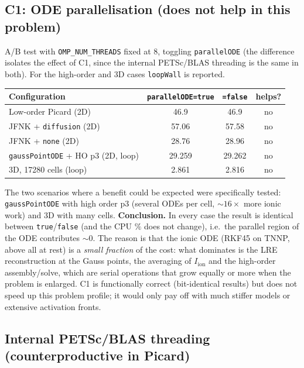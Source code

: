 \documentclass[11pt,a4paper]{article}
\newcommand{\code}[1]{\texttt{\small #1}}
\newcommand{\Iion}{I_{\mathrm{ion}}}
\newcommand{\dictkey}[1]{\textcolor{black!60!green}{\texttt{\footnotesize #1}}}
\begin{document}
\subsection{C1: ODE parallelisation (does not help in this problem)}
\label{sec:exp-C1}

A/B test with \code{OMP\_NUM\_THREADS} fixed at 8, toggling \dictkey{parallelODE}
(the difference isolates the effect of C1, since the internal PETSc/BLAS threading is
the same in both). For the high-order and 3D cases \code{loopWall} is reported.

\begin{center}
\begin{tabular}{@{}lccc@{}}
\toprule
Configuration & \code{parallelODE=true} & \code{=false} & helps? \\
\midrule
Low-order Picard (2D)                  & 46.9  & 46.9  & no \\
JFNK + \code{diffusion} (2D)           & 57.06 & 57.58 & no \\
JFNK + \code{none} (2D)                & 28.76 & 28.96 & no \\
\code{gaussPointODE} + HO p3 (2D, loop)& 29.259 & 29.262 & no \\
3D, \num{17280} cells (loop)           & 2.861 & 2.816 & no \\
\bottomrule
\end{tabular}
\end{center}

\noindent The two scenarios where a benefit could be expected were specifically
tested: \dictkey{gaussPointODE} with high order p3 (several ODEs per cell,
$\sim\!16\times$ more ionic work) and 3D with many cells.
\textbf{Conclusion.} In every case the result is identical between
\code{true}/\code{false} (and the CPU $\%$ does not change), i.e.\ the parallel region
of the ODE contributes $\sim 0$. The reason is that the ionic ODE (RKF45 on TNNP, above
all at rest) is a \emph{small fraction} of the cost: what dominates is the LRE
reconstruction at the Gauss points, the averaging of $\Iion$ and the high-order
assembly/solve, which are serial operations that grow equally or more when the problem
is enlarged. C1 is functionally correct (bit-identical results) but does not speed up this
problem profile; it would only pay off with much stiffer models or extensive activation
fronts.

\subsection{Internal PETSc/BLAS threading (counterproductive in Picard)}
\label{sec:exp-threads}
\end{document}
